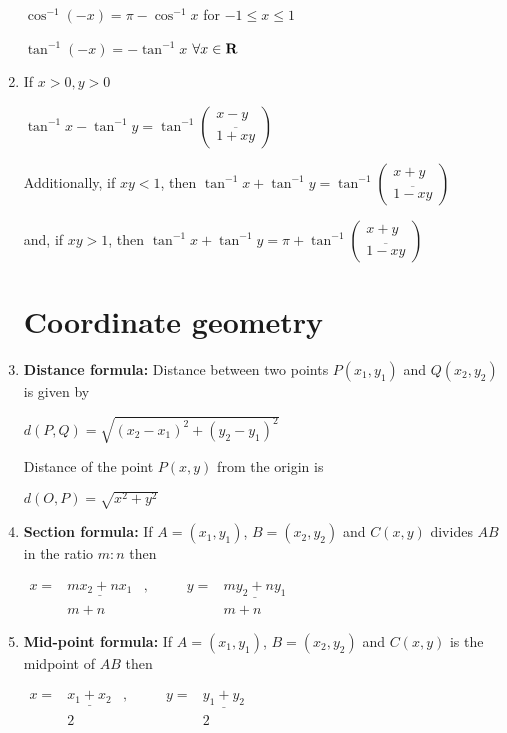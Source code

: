 \documentclass[a4paper]{article}
\begin{document}
\begin{enumerate}
$\cos^{-1}(-x) = \pi - \cos^{-1}x$ for $-1 \le x \le 1$

$\tan^{-1}(-x) = -\tan^{-1}x$ $\forall x \in \mathbf{R}$


\item
If $x>0, y>0$

$\tan^{-1}x - \tan^{-1}y = \tan^{-1}(
\begin{array}{c}
x-y \\
\overline{1+xy}
\end{array}
)$

Additionally, if $xy<1$, then 
$\tan^{-1}x + \tan^{-1}y = \tan^{-1}(
\begin{array}{c}
x+y \\
\overline{1-xy}
\end{array}
)$

and, if $xy>1$, then
$\tan^{-1}x + \tan^{-1}y = \pi + \tan^{-1}(
\begin{array}{c}
x+y \\
\overline{1-xy}
\end{array}
)$


\section{Coordinate geometry}

\item
\textbf{Distance formula:}
Distance between two points $P(x_1, y_1)$ and $Q(x_2,y_2)$ is given by

$d(P,Q) = \sqrt{(x_2-x_1)^2 + (y_2-y_1)^2}$ 

Distance of the point $P(x,y)$ from the origin is

$d(O,P) = \sqrt{x^2+y^2}$

\item
\textbf{Section formula:}
If $A=(x_1,y_1)$, $B=(x_2,y_2)$ and $C(x,y)$ 
divides $AB$ in the ratio $m:n$ then

$\begin{array}{rclrc}
x= & \underline{mx_2+nx_1}  &, \qquad & y=& \underline{my_2+ny_1} \\
 & m+n & & & m+n 
\end{array}$

\item
\textbf{Mid-point formula:}
If $A=(x_1,y_1)$, $B=(x_2,y_2)$ and $C(x,y)$ 
is the midpoint of $AB$ then

$\begin{array}{rclrc}
x= & \underline{x_1+x_2}  &, \qquad & y=& \underline{y_1+y_2} \\
 & 2 & & & 2 
\end{array}$


\end{enumerate}
\end{document}
